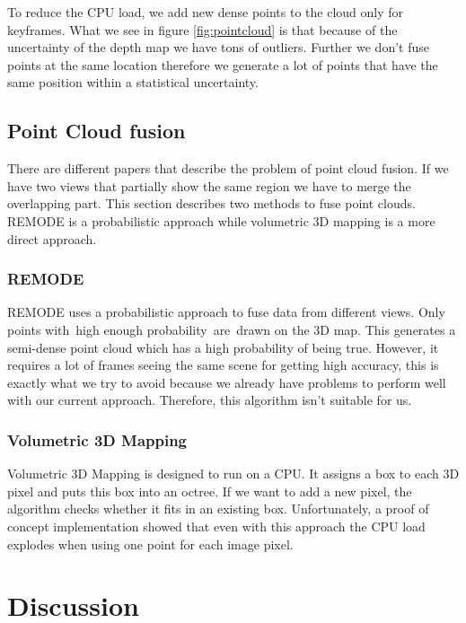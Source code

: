 \documentclass[11pt,a4paper,titlepage,oneside]{report}
\begin{document}
To reduce the CPU load, we add new dense points to the cloud only for keyframes. What we see in figure \ref{fig:pointcloud} is that because of the uncertainty of the depth map we have tons of outliers. Further we don’t fuse points at the same location therefore we generate a lot of points that have the same position within a statistical uncertainty.

\section{Point Cloud fusion}

There are different papers that describe the problem of point cloud fusion. If we have two views that partially show the same region we have to merge the overlapping part. This section describes two methods to fuse point clouds. REMODE is a probabilistic approach while volumetric 3D mapping is a more direct approach.

\subsection{REMODE}

REMODE \cite{remode} uses a probabilistic approach to fuse data from different views. Only points with high enough probability are drawn on the 3D map. This generates a semi-dense point cloud which has a high probability of being true. However, it requires a lot of frames seeing the same scene for getting high accuracy, this is exactly what we try to avoid because we already have problems to perform well with our current approach. Therefore, this algorithm isn’t suitable for us.

\subsection{Volumetric 3D Mapping}

Volumetric 3D Mapping \cite{volumetric} is designed to run on a CPU. It assigns a box to each 3D pixel and puts this box into an octree. If we want to add a new pixel, the algorithm checks whether it fits in an existing box. Unfortunately, a proof of concept implementation showed that even with this approach the CPU load explodes when using one point for each image pixel.

\chapter{Discussion}
\end{document}

